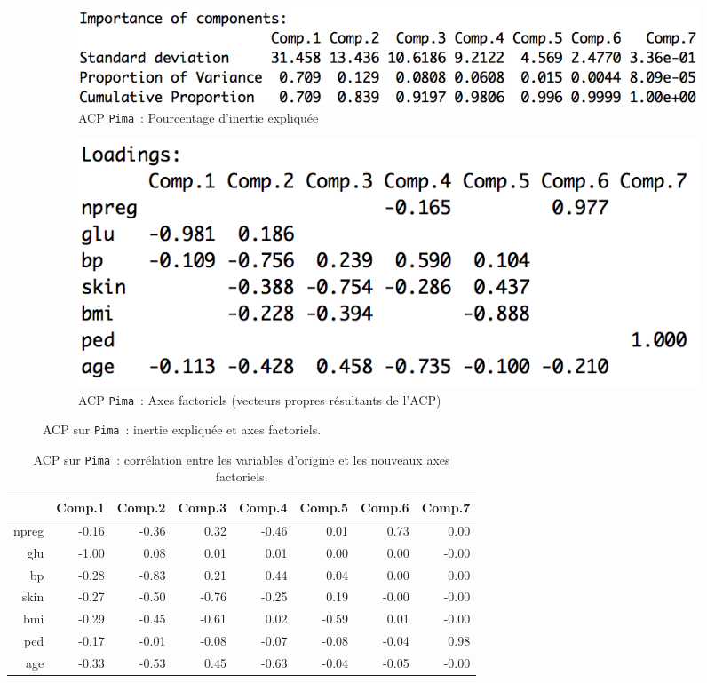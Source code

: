 \documentclass[a4paper,10pt]{report}
\begin{document}
\begin{figure}[H]
	\centering
	\captionsetup{justification=centering, margin=1cm}
	\begin{subfigure}[b]{0.45\linewidth}
		\centering
		\captionsetup{justification=centering, margin=0cm}
		\includegraphics[width=1\columnwidth]{img/2-4-ACP-Pima-Pourcentage-Inertie-Expliquee}
		\caption{\scriptsize ACP \texttt{Pima}~: Pourcentage d'inertie expliquée}
		\label{fig:2-4-ACP-Pima-Pourcentage-Inertie-Expliquee}
	\end{subfigure}%
	\begin{subfigure}[b]{0.45\linewidth}
		\centering
		\captionsetup{justification=centering, margin=0cm}
		\includegraphics[width=.8\columnwidth]{img/2-4-ACP-Pima-Axes-Factoriels}
		\caption{\scriptsize ACP \texttt{Pima}~: Axes factoriels (vecteurs propres résultants de l'ACP)}
		\label{fig:2-4-ACP-Pima-Axes-Factoriels}
	\end{subfigure}%
	\caption{
		\small ACP sur \texttt{Pima}~: inertie expliquée et axes factoriels.
	}
	\label{fig:ACP-Pima-inertie-et-axes-factoriels}%
\end{figure}




\begin{table}[H]
	\centering
	\captionsetup{justification=centering, margin=2cm}
	\caption{ACP sur \texttt{Pima}~: corrélation entre les variables d'origine et les nouveaux axes factoriels.}
	\begin{tabular}{r|rrrrrrr}
		& Comp.1 & Comp.2 & Comp.3 & Comp.4 & Comp.5 & Comp.6 & Comp.7 \\ 
		\hline
		npreg & -0.16 & -0.36 & 0.32 & -0.46 & 0.01 & 0.73 & 0.00 \\ 
		glu & -1.00 & 0.08 & 0.01 & 0.01 & 0.00 & 0.00 & -0.00 \\ 
		bp & -0.28 & -0.83 & 0.21 & 0.44 & 0.04 & 0.00 & 0.00 \\ 
		skin & -0.27 & -0.50 & -0.76 & -0.25 & 0.19 & -0.00 & -0.00 \\ 
		bmi & -0.29 & -0.45 & -0.61 & 0.02 & -0.59 & 0.01 & -0.00 \\ 
		ped & -0.17 & -0.01 & -0.08 & -0.07 & -0.08 & -0.04 & 0.98 \\ 
		age & -0.33 & -0.53 & 0.45 & -0.63 & -0.04 & -0.05 & -0.00 \\ 
	\end{tabular}
	\label{table:correlation-acp-pima}
\end{table}
\end{document}
